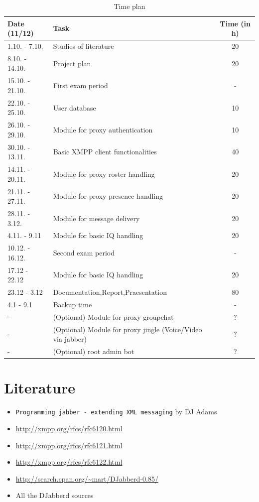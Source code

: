 \documentclass[a4paper,10pt,numbers=noendperiod]{scrartcl}
\begin{document}
\begin{table}[h]
	\centering
	\begin{tabularx}{\textwidth}{|l|X|c|}
	\hline
	\textbf{Date (11/12)} & \textbf{Task} & \textbf{Time (in h)} \\
	\hline
	\hline
	 1.10. - 7.10. & Studies of literature & 20 \\
	\hline
         8.10. - 14.10. & Project plan & 20 \\
	\hline
	15.10. - 21.10. & First exam period & - \\
        \hline
	22.10. - 25.10. & User database & 10 \\
	\hline
	26.10. - 29.10. & Module for proxy authentication & 10 \\
	\hline
	30.10. - 13.11. & Basic XMPP client functionalities  & 40 \\ 
	\hline
	14.11. - 20.11. & Module for proxy roster handling & 20 \\ 
	\hline
	21.11. - 27.11. & Module for proxy presence handling & 20 \\ 
	\hline
	28.11. -  3.12. & Module for message delivery & 20 \\
	\hline
	 4.11. -  9.11  & Module for basic IQ handling & 20 \\
	\hline
	10.12. - 16.12. & Second exam period & - \\
	\hline
	17.12  - 22.12  & Module for basic IQ handling & 20 \\ 
	\hline
	23.12  -  3.12  & Documentation,Report,Praesentation & 80 \\ 
	\hline
	  4.1  -   9.1  & Backup time & - \\
	\hline
	       -        & (Optional) Module for proxy groupchat & ? \\
	\hline
	       -        & (Optional) Module for proxy jingle (Voice/Video via jabber)  & ? \\
	\hline
	       -        & (Optional) root admin bot                                    & ? \\ 
	\hline
	\end{tabularx}
	\caption{Time plan}
	\label{tab:estimatedtime}
\end{table}

\newpage
\section{Literature}
\begin{itemize}
	\item \texttt{Programming jabber - extending XML messaging} by DJ Adams\\
	\item \url{http://xmpp.org/rfcs/rfc6120.html}\\
	\item \url{http://xmpp.org/rfcs/rfc6121.html}\\
	\item \url{http://xmpp.org/rfcs/rfc6122.html}\\
	\item \url{http://search.cpan.org/~mart/DJabberd-0.85/}\\
	\item All the DJabberd sources
\end{itemize}
\end{document}
